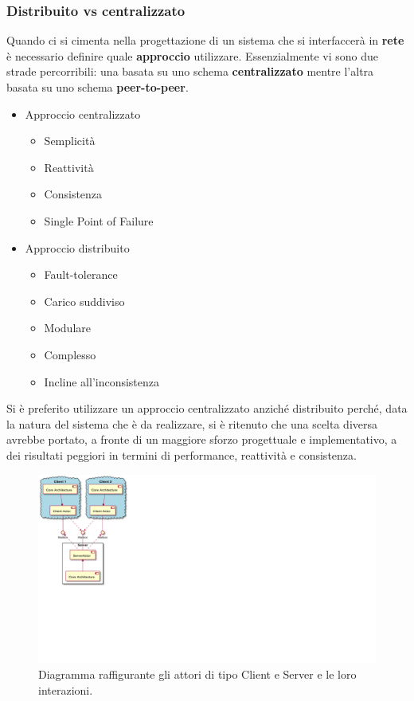 \subsubsection{Distribuito vs centralizzato}
Quando ci si cimenta nella progettazione di un sistema che si interfaccerà in \textbf{rete} è necessario definire quale \textbf{approccio} utilizzare. Essenzialmente vi sono due strade percorribili: una basata su uno schema \textbf{centralizzato} mentre l'altra basata su uno schema \textbf{peer-to-peer}.
\begin{itemize}
    \item Approccio centralizzato
        \begin{itemize}
        \setlength\itemsep{0em}
        \item Semplicità
        \item Reattività
        \item Consistenza
        \item Single Point of Failure
    \end{itemize}
    
    \item Approccio distribuito
        \begin{itemize}
        \setlength\itemsep{0em}
        \item Fault-tolerance
        \item Carico suddiviso
        \item Modulare
        \item Complesso
        \item Incline all'inconsistenza
        
    \end{itemize}
\end{itemize}
Si è preferito utilizzare un approccio centralizzato anziché distribuito perché, data la natura del sistema che è da realizzare, si è ritenuto che una scelta diversa avrebbe portato, a fronte di un maggiore sforzo progettuale e implementativo, a dei risultati peggiori in termini di performance, reattività e consistenza.
\begin{figure}[H]
	\centering
	\includegraphics[width=0.70\columnwidth]{plantuml/rendered/componentDiagrams/clientServerComponentDiagram.pdf}
	\caption{Diagramma raffigurante gli attori di tipo Client e Server e le loro interazioni.}
	\label{fig:clientServerComponentDiagram}
\end{figure}

